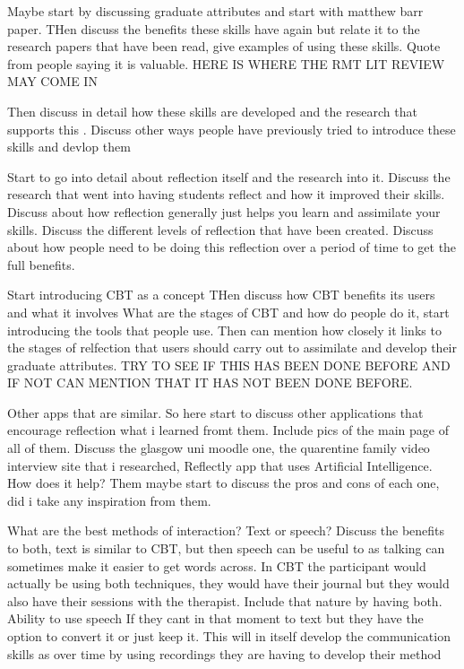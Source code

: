 \documentclass{l4proj}
\begin{document}
Maybe start by discussing graduate attributes and start with matthew barr paper. 
THen discuss the benefits these skills have again but relate it to the research papers that have been 
read, give examples of using these skills. Quote from people saying it is valuable.
HERE IS WHERE THE RMT LIT REVIEW MAY COME IN
\par 
Then discuss in detail how these skills are developed and the research that supports this .
Discuss other ways people have previously tried to introduce these skills and devlop them 
\par 
Start to go into detail about reflection itself and the research into it.
Discuss the research that went into having students reflect and how it improved their skills. Discuss about
how reflection generally just helps you learn and assimilate your skills. 
Discuss the different levels of reflection that have been created.
Discuss about how people need to be doing this reflection over a period of time to get the full benefits.
\par 
Start introducing CBT as a concept
THen discuss how CBT benefits its users and what it involves
What are the stages of CBT and how do people do it, start introducing the tools that people use.
Then can mention how closely it links to the stages of relfection that users should carry out to 
assimilate and develop their graduate attributes. 
TRY TO SEE IF THIS HAS BEEN DONE BEFORE AND IF NOT CAN MENTION THAT IT HAS NOT BEEN DONE BEFORE. 
\par 
Other apps that are similar. So here start to discuss other applications that encourage reflection 
what i learned fromt them.
Include pics of the main page of all of them.
Discuss the glasgow uni moodle one, the quarentine family video interview site that i researched,
Reflectly app that uses Artificial Intelligence. How does it help? Them maybe start to discuss the pros and 
cons of each one, did i take any inspiration from them. 
\par 
What are the best methods of interaction? Text or speech? Discuss the benefits to both, text is similar 
to CBT, but then speech can be useful to as talking can sometimes make it easier to get words across. In
CBT the participant would actually be using both techniques, they would have their journal but they 
would also have their sessions with the therapist. Include that nature by having both. Ability to use speech If
they cant in that moment to text but they have the option to convert it or just keep it. This will in itself
develop the communication skills as over time by using recordings they are having to develop their method
\end{document}

